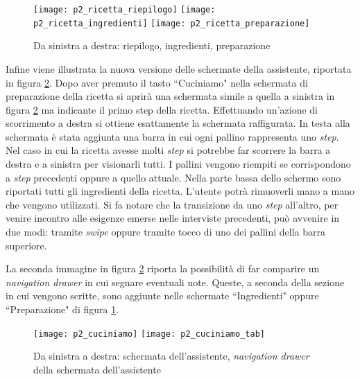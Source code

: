 \begin{figure}[ht]
  \begin{center}
    \texttt{[image: p2\_ricetta\_riepilogo]}
    \texttt{[image: p2\_ricetta\_ingredienti]}
    \texttt{[image: p2\_ricetta\_preparazione]}
    \caption{Da sinistra a destra: riepilogo, ingredienti, preparazione}
    \label{fig:p2_ricetta}
  \end{center}
\end{figure}


Infine viene illustrata la nuova versione delle schermate della assistente, riportata in figura \ref{fig:p2_cuciniamo}.
Dopo aver premuto il tasto ``Cuciniamo" nella schermata di preparazione della ricetta si aprirà una schermata simile a quella a sinistra in figura \ref{fig:p2_cuciniamo} ma indicante il primo step della ricetta.
Effettuando un'azione di scorrimento a destra si ottiene esattamente la schermata raffigurata.
In testa alla schermata è stata aggiunta una barra in cui ogni pallino rappresenta uno \textit{step}.
Nel caso in cui la ricetta avesse molti \textit{step} si potrebbe far scorrere la barra a destra e a sinistra per visionarli tutti.
I pallini vengono riempiti se corrispondono a \textit{step} precedenti oppure a quello attuale.
Nella parte bassa dello schermo sono riportati tutti gli ingredienti della ricetta.
L'utente potrà rimuoverli mano a mano che vengono utilizzati.
Si fa notare che la transizione da uno \textit{step} all'altro, per venire incontro alle esigenze emerse nelle interviste precedenti, può avvenire in due modi: tramite \textit{swipe} oppure tramite tocco di uno dei pallini della barra superiore.

La seconda immagine in figura \ref{fig:p2_cuciniamo} riporta la possibilità di far comparire un \textit{navigation drawer} in cui segnare eventuali note.
Queste, a seconda della sezione in cui vengono scritte, sono aggiunte nelle schermate ``Ingredienti" oppure ``Preparazione" di figura \ref{fig:p2_ricetta}.

\begin{figure}[ht]
  \begin{center}
    \texttt{[image: p2\_cuciniamo]}
    \texttt{[image: p2\_cuciniamo\_tab]}
    \caption{Da sinistra a destra: schermata dell'assistente, \textit{navigation drawer} della schermata dell'assistente}
    \label{fig:p2_cuciniamo}
  \end{center}
\end{figure}

